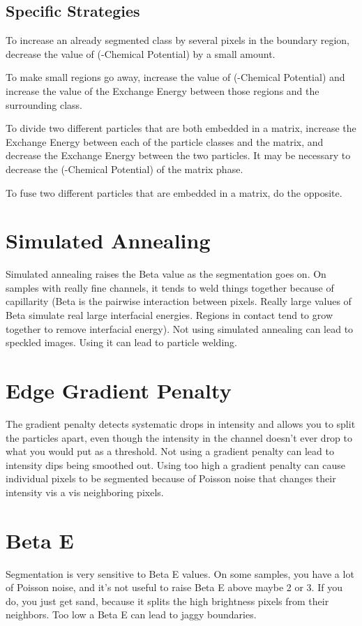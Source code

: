 \documentclass[12pt,oneside]{book}
\begin{document}
\subsection{Specific Strategies}

To increase an already segmented class by several pixels in the boundary
region, decrease the value of (-Chemical Potential) by a small amount.

To make small regions go away, increase the value of (-Chemical Potential)
and increase the value of the Exchange Energy between those regions and the
surrounding class.

To divide two different particles that are both embedded in a matrix,
increase the Exchange Energy between each of the particle classes and the
matrix, and decrease the Exchange Energy between the two particles. It may
be necessary to decrease the (-Chemical Potential) of the matrix phase.

To fuse two different particles that are embedded in a matrix, do the
opposite.

\section{Simulated Annealing}
Simulated annealing raises the Beta value as the segmentation goes on. On samples with really fine channels, it tends to weld things together because of capillarity (Beta is the pairwise interaction between pixels. Really large values of Beta simulate real large interfacial energies. Regions in contact tend to grow together to remove interfacial energy). Not using simulated annealing can lead to speckled images. Using it can lead to particle welding.
\section{Edge Gradient Penalty}
The gradient penalty detects systematic drops in intensity and allows you to split the particles apart, even though the intensity in the channel doesn't ever drop to what you would put as a threshold. Not using a gradient penalty can lead to intensity dips being smoothed out. Using too high a gradient penalty can cause individual pixels to be segmented because of Poisson noise that changes their intensity vis a vis neighboring pixels.
\section{Beta E}
Segmentation is very sensitive to Beta E values. On some samples, you have a lot of Poisson noise, and it's not useful to raise Beta E above maybe 2 or 3. If you do, you just get sand, because it splits the high brightness pixels from their neighbors. Too low a Beta E can lead to jaggy boundaries.
\end{document}

